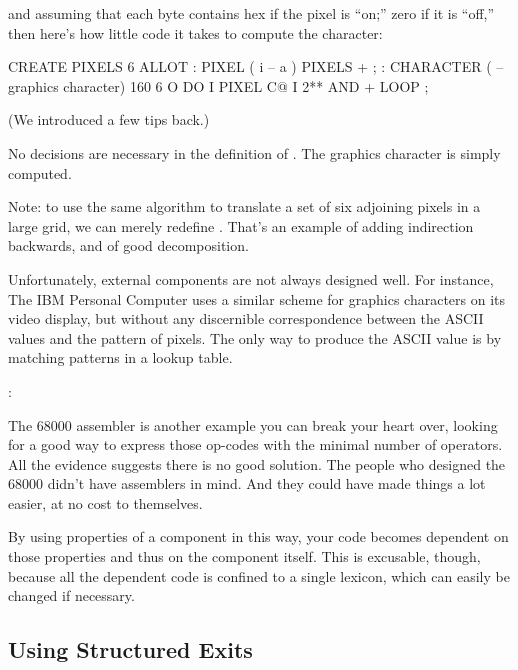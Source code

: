 \noindent and assuming that each byte contains hex  if the pixel is
``on;'' zero if it is ``off,'' then here's how little code it takes to
compute the character:

\begin{Code}
CREATE PIXELS  6 ALLOT
: PIXEL  ( i -- a )  PIXELS + ;
: CHARACTER  ( -- graphics character)
   160   6 O DO  I PIXEL C@  I 2** AND  +  LOOP ;
\end{Code}
(We introduced  a few tips back.)

No decisions are necessary in the definition of . The
graphics character is simply computed.

Note: to use the same algorithm to translate a set of six adjoining
pixels in a large grid, we can merely redefine . That's an example
of adding indirection backwards, and of good decomposition.

Unfortunately, external components are not always designed well.
For instance, The IBM Personal Computer uses a similar scheme for
graphics characters on its video display, but without any discernible
correspondence between the ASCII values and the pattern of pixels. The
only way to produce the ASCII value is by matching patterns in a lookup
table.

\begin{interview}
:
\begin{tfquot}
The 68000 assembler is another example you can break your heart over,
looking for a good way to express those op-codes with the minimal number
of operators. All the evidence suggests there is no good solution. The
people who designed the 68000 didn't have assemblers in mind. And they
could have made things a lot easier, at no cost to themselves.
\end{tfquot}
\end{interview}
By using properties of a component in this way, your code becomes
dependent on those properties and thus on the component itself. This is
excusable, though, because all the dependent code is confined to a single
lexicon, which can easily be changed if necessary.%
%

\subsection{Using Structured Exits}%
%

